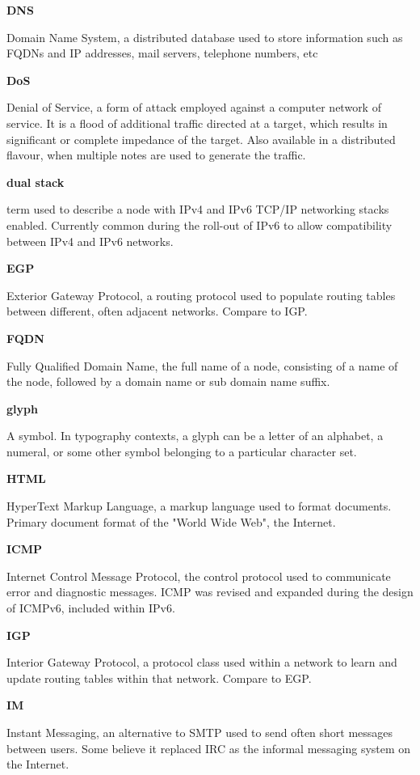 \textbf{DNS}

Domain Name System, a distributed database used to store information
such as FQDNs and IP addresses, mail servers, telephone numbers, etc

\textbf{DoS}

Denial of Service, a form of attack employed against a computer network
of service. It is a flood of additional traffic directed at a target,
which results in significant or complete impedance of the target. Also
available in a distributed flavour, when multiple notes are used to
generate the traffic.

\textbf{dual stack}

term used to describe a node with IPv4 and IPv6 TCP/IP networking stacks
enabled. Currently common during the roll-out of IPv6 to allow
compatibility between IPv4 and IPv6 networks.

\textbf{EGP}

Exterior Gateway Protocol, a routing protocol used to populate routing
tables between different, often adjacent networks. Compare to IGP.

\textbf{FQDN}

Fully Qualified Domain Name, the full name of a node, consisting of a
name of the node, followed by a domain name or sub domain name suffix.

\textbf{glyph}

A symbol. In typography contexts, a glyph can be a letter of an
alphabet, a numeral, or some other symbol belonging to a particular
character set.

\textbf{HTML}

HyperText Markup Language, a markup language used to format documents.
Primary document format of the "World Wide Web", the Internet.

\textbf{ICMP}

Internet Control Message Protocol, the control protocol used to
communicate error and diagnostic messages. ICMP was revised and expanded 
during the design of ICMPv6, included within IPv6.

\textbf{IGP}

Interior Gateway Protocol, a protocol class used within a network to
learn and update routing tables within that network. Compare to EGP.

\textbf{IM}

Instant Messaging, an alternative to SMTP used to send often short
messages between users. Some believe it replaced IRC as the informal
messaging system on the Internet. 

